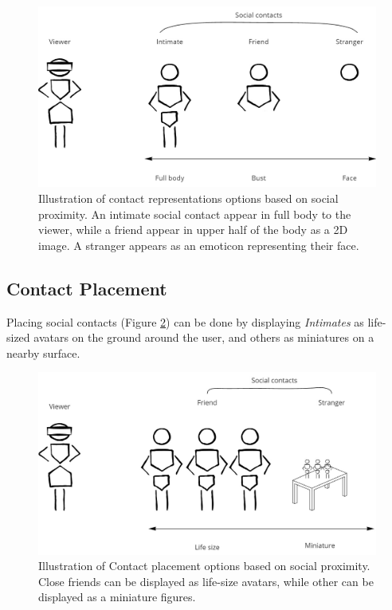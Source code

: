 \begin{figure}[h]
    \centering
    \includegraphics[width=0.8\linewidth]{images/30-continuum/Continuum-representation.jpg}
    \caption{Illustration of contact representations options based on social proximity. An intimate social contact appear in full body to the viewer, while a friend appear in upper half of the body as a 2D image. A stranger appears as an emoticon representing their face.}
    \label{fig:continuum:contact-representations}
\end{figure}


\subsection{Contact Placement}

Placing social contacts (Figure \ref{fig:continuum:contact-placement}) can be done by displaying \textit{Intimates} as life-sized avatars on the ground around the user, and others as miniatures on a nearby surface. 

\begin{figure}[h]
    \centering
    \includegraphics[width=0.8\linewidth]{images/30-continuum/Continuum-placement.jpg}
    \caption{Illustration of Contact placement options based on social proximity. Close friends can be displayed as life-size avatars, while other can be displayed as a miniature figures.}
    \label{fig:continuum:contact-placement}
\end{figure}


